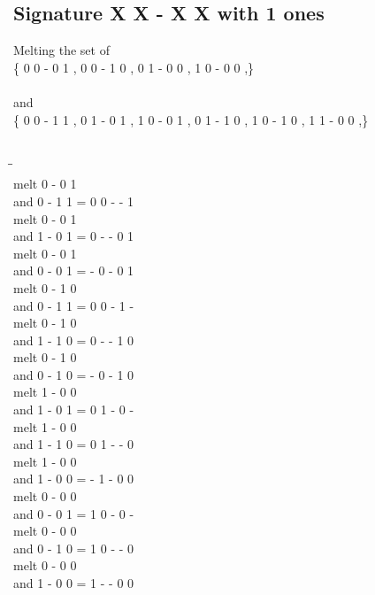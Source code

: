 \documentclass{article}
\begin{document}
\subsection{Signature X X - X X with 1 ones}
Melting the set of\\
\{ 0  0  -  0  1 , 0  0  -  1  0 , 0  1  -  0  0 , 1  0  -  0  0 ,\}\\\\
and\\
\{ 0  0  -  1  1 , 0  1  -  0  1 , 1  0  -  0  1 , 0  1  -  1  0 , 1  0  -  1  0 , 1  1  -  0  0 ,\}\\\\
\begin{tabbing}
\hspace{3cm}\=\hspace{3cm}\=\hspace{3cm}\\[1cm]
melt  0  -  0  1 \\
and  0  -  1  1 \>
 =  0  0  -  -  1 \\[1mm]
melt  0  -  0  1 \\
and  1  -  0  1 \>
 =  0  -  -  0  1 \\[1mm]
melt  0  -  0  1 \\
and  0  -  0  1 \>
 =  -  0  -  0  1 \\[1mm]
melt  0  -  1  0 \\
and  0  -  1  1 \>
 =  0  0  -  1  - \\[1mm]
melt  0  -  1  0 \\
and  1  -  1  0 \>
 =  0  -  -  1  0 \\[1mm]
melt  0  -  1  0 \\
and  0  -  1  0 \>
 =  -  0  -  1  0 \\[1mm]
melt  1  -  0  0 \\
and  1  -  0  1 \>
 =  0  1  -  0  - \\[1mm]
melt  1  -  0  0 \\
and  1  -  1  0 \>
 =  0  1  -  -  0 \\[1mm]
melt  1  -  0  0 \\
and  1  -  0  0 \>
 =  -  1  -  0  0 \\[1mm]
melt  0  -  0  0 \\
and  0  -  0  1 \>
 =  1  0  -  0  - \\[1mm]
melt  0  -  0  0 \\
and  0  -  1  0 \>
 =  1  0  -  -  0 \\[1mm]
melt  0  -  0  0 \\
and  1  -  0  0 \>
 =  1  -  -  0  0 \\[1mm]
\end{tabbing}
\newpage
\end{document}
